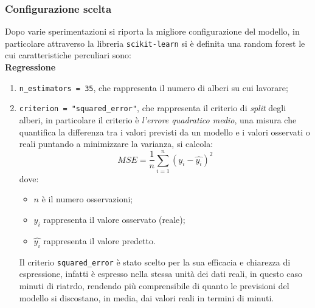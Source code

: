 \documentclass[italian,12pt,a4paper]{article}
\begin{document}
	\subsubsection{Configurazione scelta}
	Dopo varie sperimentazioni si riporta la migliore configurazione del modello, in particolare attraverso la libreria \texttt{scikit-learn} \cite{scikit_learn} si è definita una random forest le cui caratteristiche perculiari sono:\\
	\linebreak
	 \textbf{Regressione}
		\begin{enumerate}
			
			\item \texttt{n\_estimators = 35}, che rappresenta il numero di alberi su cui lavorare;
			\item  \texttt{criterion = "squared\_error"}, che rappresenta il criterio di \textit{split} degli alberi, in particolare il criterio è \textit{l'errore quadratico medio}, una misura che quantifica la differenza tra i valori previsti da un modello e i valori osservati o reali puntando a minimizzare la varianza, si calcola:
				$$MSE = \frac{1}{n}\sum_{i = 1}^{n}(y_i - \hat{y_i})^2$$
			dove:
				\begin{itemize}
					\item $n$ è il numero osservazioni;
					\item $y_i$ rappresenta il valore osservato (reale);
					\item $\hat{y_i}$ rappresenta il valore predetto.
				\end{itemize}

			Il criterio \texttt{squared\_error} è stato scelto per la sua efficacia e chiarezza di espressione, infatti è espresso nella stessa unità dei dati reali, in questo caso minuti di riatrdo, rendendo più comprensibile di quanto le previsioni del modello si discostano, in media, dai valori reali in termini di minuti.
			
		\end{enumerate}
		
\end{document}
